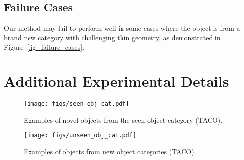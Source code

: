 \subsection{Failure Cases} \label{sec:failurecase}

Our method may fail to perform well in some cases where the object is from a brand new category with challenging thin geometry, as demonstrated in Figure~\ref{fig_failure_cases}. 



\section{Additional Experimental Details} \label{sec:supp_exp_details}






\begin{figure}[h]
  \centering
  \texttt{[image: figs/seen\_obj\_cat.pdf]}
  \caption{
  Examples of novel objects from the seen object category (TACO). 
  }
  \label{fig_seen_obj_cat}
\end{figure}

\begin{figure}[h]
  \centering
  \texttt{[image: figs/unseen\_obj\_cat.pdf]}
  \caption{
  Examples of objects from new object categories (TACO). 
  }
  \label{fig_unseen_obj_cat}
\end{figure}

